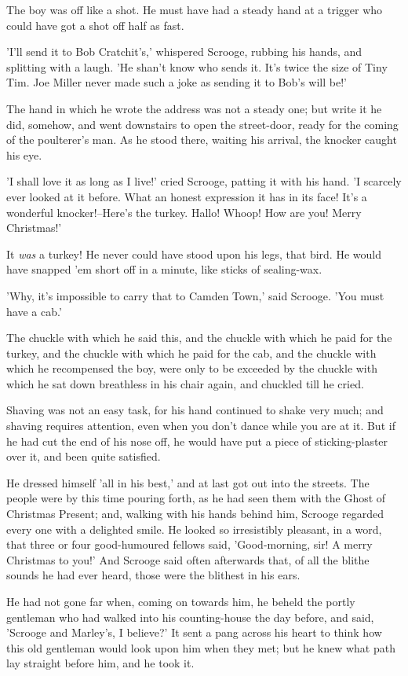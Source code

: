 The boy was off like a shot. He must have had a steady hand at a trigger
who could have got a shot off half as fast.

'I'll send it to Bob Cratchit's,' whispered Scrooge, rubbing his hands,
and splitting with a laugh. 'He shan't know who sends it. It's twice the
size of Tiny Tim. Joe Miller never made such a joke as sending it to
Bob's will be!'

The hand in which he wrote the address was not a steady one; but write
it he did, somehow, and went downstairs to open the street-door, ready
for the coming of the poulterer's man. As he stood there, waiting his
arrival, the knocker caught his eye.

'I shall love it as long as I live!' cried Scrooge, patting it with his
hand. 'I scarcely ever looked at it before. What an honest expression it
has in its face! It's a wonderful knocker!--Here's the turkey. Hallo!
Whoop! How are you! Merry Christmas!'

It \emph{was} a turkey! He never could have stood upon his legs, that bird.
He would have snapped 'em short off in a minute, like sticks of
sealing-wax.

'Why, it's impossible to carry that to Camden Town,' said Scrooge. 'You
must have a cab.'

The chuckle with which he said this, and the chuckle with which he paid
for the turkey, and the chuckle with which he paid for the cab, and the
chuckle with which he recompensed the boy, were only to be exceeded by
the chuckle with which he sat down breathless in his chair again, and
chuckled till he cried.

Shaving was not an easy task, for his hand continued to shake very much;
and shaving requires attention, even when you don't dance while you are
at it. But if he had cut the end of his nose off, he would have put a
piece of sticking-plaster over it, and been quite satisfied.

He dressed himself 'all in his best,' and at last got out into the
streets. The people were by this time pouring forth, as he had seen them
with the Ghost of Christmas Present; and, walking with his hands behind
him, Scrooge regarded every one with a delighted smile. He looked so
irresistibly pleasant, in a word, that three or four good-humoured
fellows said, 'Good-morning, sir! A merry Christmas to you!' And Scrooge
said often afterwards that, of all the blithe sounds he had ever heard,
those were the blithest in his ears.

He had not gone far when, coming on towards him, he beheld the portly
gentleman who had walked into his counting-house the day before, and
said, 'Scrooge and Marley's, I believe?' It sent a pang across his heart
to think how this old gentleman would look upon him when they met; but
he knew what path lay straight before him, and he took it.

